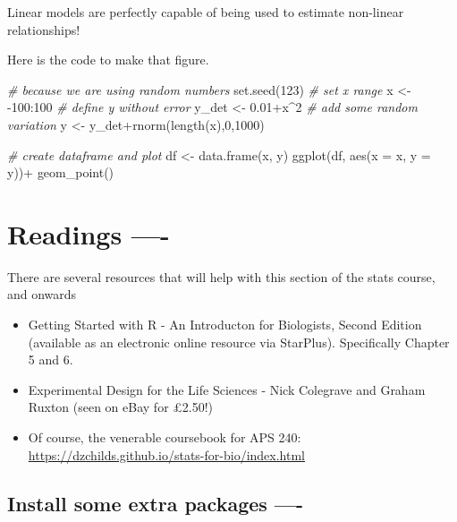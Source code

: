 \documentclass[
]{book}
\newenvironment{Shaded}{\begin{snugshade}}{\end{snugshade}}
\newcommand{\AttributeTok}[1]{\textcolor[rgb]{0.77,0.63,0.00}{#1}}
\newcommand{\CommentTok}[1]{\textcolor[rgb]{0.56,0.35,0.01}{\textit{#1}}}
\newcommand{\DecValTok}[1]{\textcolor[rgb]{0.00,0.00,0.81}{#1}}
\newcommand{\FloatTok}[1]{\textcolor[rgb]{0.00,0.00,0.81}{#1}}
\newcommand{\FunctionTok}[1]{\textcolor[rgb]{0.00,0.00,0.00}{#1}}
\newcommand{\NormalTok}[1]{#1}
\newcommand{\OtherTok}[1]{\textcolor[rgb]{0.56,0.35,0.01}{#1}}
\newcommand{\SpecialCharTok}[1]{\textcolor[rgb]{0.00,0.00,0.00}{#1}}
\providecommand{\tightlist}{%
  \setlength{\itemsep}{0pt}\setlength{\parskip}{0pt}}
\begin{document}
Linear models are perfectly capable of being used to estimate non-linear relationships!

Here is the code to make that figure.

\begin{Shaded}
\begin{Highlighting}[]
\CommentTok{\# because we are using random numbers}
\FunctionTok{set.seed}\NormalTok{(}\DecValTok{123}\NormalTok{)}
\CommentTok{\# set x range}
\NormalTok{x }\OtherTok{\textless{}{-}} \SpecialCharTok{{-}}\DecValTok{100}\SpecialCharTok{:}\DecValTok{100}
\CommentTok{\# define y without error}
\NormalTok{y\_det }\OtherTok{\textless{}{-}} \FloatTok{0.01}\SpecialCharTok{+}\NormalTok{x}\SpecialCharTok{\^{}}\DecValTok{2}
\CommentTok{\# add some random variation}
\NormalTok{y }\OtherTok{\textless{}{-}}\NormalTok{ y\_det}\SpecialCharTok{+}\FunctionTok{rnorm}\NormalTok{(}\FunctionTok{length}\NormalTok{(x),}\DecValTok{0}\NormalTok{,}\DecValTok{1000}\NormalTok{)}

\CommentTok{\# create dataframe and plot}
\NormalTok{df }\OtherTok{\textless{}{-}} \FunctionTok{data.frame}\NormalTok{(x, y)}
\FunctionTok{ggplot}\NormalTok{(df, }\FunctionTok{aes}\NormalTok{(}\AttributeTok{x =}\NormalTok{ x, }\AttributeTok{y =}\NormalTok{ y))}\SpecialCharTok{+}
  \FunctionTok{geom\_point}\NormalTok{()}
\end{Highlighting}
\end{Shaded}

\hypertarget{readings--}{%
\chapter{Readings ----}\label{readings--}}

There are several resources that will help with this section of the stats course, and onwards

\begin{itemize}
\tightlist
\item
  Getting Started with R - An Introducton for Biologists, Second Edition (available as an electronic online resource via StarPlus). Specifically Chapter 5 and 6.
\item
  Experimental Design for the Life Sciences - Nick Colegrave and Graham Ruxton (seen on eBay for £2.50!)
\item
  Of course, the venerable coursebook for APS 240: \url{https://dzchilds.github.io/stats-for-bio/index.html}
\end{itemize}

\hypertarget{install-some-extra-packages--}{%
\section{Install some extra packages ----}\label{install-some-extra-packages--}}
\end{document}
